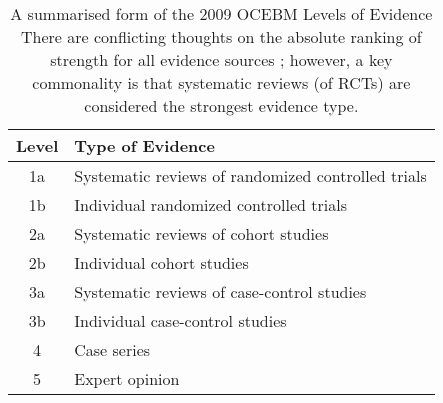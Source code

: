 \begin{table}[ht]
\centering
\small
\begin{adjustbox}{width=\columnwidth}
\begin{tabular}{|c|l|}
\hline
\textbf{Level} & \textbf{Type of Evidence} \\
\hline
1a & Systematic reviews of randomized controlled trials \\
1b & Individual randomized controlled trials \\
2a & Systematic reviews of cohort studies \\
2b & Individual cohort studies \\
3a & Systematic reviews of case-control studies \\
3b & Individual case-control studies \\
4 & Case series \\
5 & Expert opinion \\
\hline
\end{tabular}
\end{adjustbox}
\caption[A summarised form of the 2009 OCEBM Levels of Evidence]{A summarised form of the 2009 OCEBM Levels of Evidence \cite{noauthor_oxford_nodate} There are conflicting thoughts on the absolute ranking of strength for all evidence sources \cite{swanson_how_2010, guyatt_grade_2008}; however, a key commonality is that systematic reviews (of RCTs) are considered the strongest evidence type.}
\label{tab:evidence_levels}
\end{table}